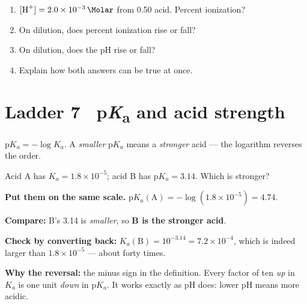 \documentclass{apchem-worksheet}
\begin{document}
\begin{yourturn}
\begin{enumerate}[leftmargin=*,itemsep=0.5em]
  \item $[\ce{H+}] = \SI{2.0e-3}{\Molar}$ from \SI{0.50}{\Molar} acid.
        Percent ionization? \workspace[1.6cm]
  \item On dilution, does percent ionization rise or fall?
        \workspace[1.4cm]
  \item On dilution, does the pH rise or fall? \workspace[1.4cm]
  \item Explain how both answers can be true at once.
        \workspace[2.0cm]
\end{enumerate}
\end{yourturn}

\section*{\sffamily Ladder 7 \textbullet\ p\emph{K}\textsubscript{a} and acid strength}

$\mathrm{p}K_a = -\log K_a$. A \emph{smaller} $\mathrm{p}K_a$ means a
\emph{stronger} acid --- the logarithm reverses the order.

\begin{workedexample}
Acid A has $K_a = 1.8\times10^{-5}$; acid B has
$\mathrm{p}K_a = 3.14$. Which is stronger?

\textbf{Put them on the same scale.}
$\mathrm{p}K_a(\text{A}) = -\log(1.8\times10^{-5}) = \mathbf{4.74}$.

\textbf{Compare:} B's \num{3.14} is \emph{smaller}, so \textbf{B is the
stronger acid}.

\textbf{Check by converting back:}
$K_a(\text{B}) = 10^{-3.14} = 7.2\times10^{-4}$, which is indeed larger
than $1.8\times10^{-5}$ --- about forty times. \checkmark

\textbf{Why the reversal:} the minus sign in the definition. Every factor
of ten \emph{up} in $K_a$ is one unit \emph{down} in $\mathrm{p}K_a$. It
works exactly as pH does: lower pH means more acidic.
\end{workedexample}
\end{document}
